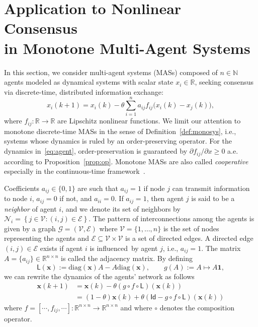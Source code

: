 \documentclass[journal,twoside,web]{ieeecolor}
\newcommand{\rea }{\mathbb{R}}
\newcommand{\nat}{\mathbb{N}}
\newcommand{\xb}{\boldsymbol{x}}
\newcommand{\Ls}{\mathsf{L}}
\newcommand{\Is}{\mathsf{Id}}
\newcommand{\Gc}{\mathcal{G}}
\newcommand{\Nc}{\mathcal{N}}
\newcommand{\bone}{\boldsymbol{1}}
\newcommand{\diag}{\mathrm{diag}}
\begin{document}
\section{Application to Nonlinear Consensus\\ in Monotone Multi-Agent Systems}\label{sec:app2}
%
In this section, we consider multi-agent systems (MASs) composed of $n\in\nat$ agents modeled as dynamical systems with scalar state $x_i\in\mathbb{R}$, seeking consensus via discrete-time, distributed information exchange:
%
\begin{equation}\label{eq:agent}
x_i(k+1) = x_i(k)-\theta \sum_{i=1}^na_{ij}f_{ij}\Big(x_i(k)-x_j(k)\Big),
\end{equation}
%
where $f_{ij}:\mathbb{R}\rightarrow \mathbb{R}$ are Lipschitz nonlinear functions. We limit our attention to monotone discrete-time MASs in the sense of Definition~\ref{def:monosys}, i.e., systems whose dynamics is ruled by an order-preserving operator. For the dynamics in~\eqref{eq:agent}, order-preservation is guaranteed by $\partial f_{ij}/\partial x\geq 0$ a.e. according to Proposition~\ref{prop:op}. Monotone MASs are also called \textit{cooperative} especially in the continuous-time framework~\cite{Leenheer01,Hirsch03,Smith08,Bokharaie10,manfredi2017necessary}.

Coefficients $a_{ij}\in\{0,1\}$ are such that $a_{ij}=1$ if node $j$ can transmit information to node $i$, $a_{ij}=0$ if not, and $a_{ii}=0$. If $a_{ij}=1$, then agent $j$ is said to be a \emph{neighbor} of agent $i$, and we denote its set of neighbors by $\Nc_i=\left\{j\in \mathcal{V}: (i,j)\in \mathcal{E}\right\}$. The pattern of interconnections among the agents is given by a graph $\Gc=(\mathcal{V},\mathcal{E})$ where $\mathcal{V}=\{1,\ldots,n\}$ is the set of nodes representing the agents and $\mathcal{E}\subseteq \mathcal{V} \times \mathcal{V}$ is a set of directed edges. A directed edge $(i,j)\in \mathcal{E}$ exists if agent $i$ is influenced~by agent $j$, i.e., $a_{ij}=1$. The matrix $A=\{a_{ij}\}\in\mathbb{R}^{n\times n}$ is called the adjacency matrix.
%
%
By defining 
%
$$
\Ls(\xb):=\diag(\xb)A-A\diag(\xb),\qquad g(A):=A\mapsto A\bone,
$$
we can rewrite the dynamics of the agents' network as follows
%
\begin{equation}\label{eq:mas}
\begin{aligned}
    \xb(k+1) &= \xb(k)-\theta (g\circ f\circ \Ls)(\xb(k)) \\
    & = (1-\theta)\xb(k)+\theta(\Is-g\circ f\circ \Ls)(\xb(k))
\end{aligned}
\end{equation}
%
where $f=[\cdots,f_{ij},\cdots]:\rea^{n\times n}\rightarrow\rea^{n \times n}$ and where $\circ$ denotes the composition operator.
\end{document}

